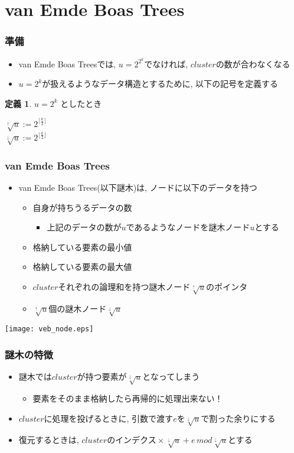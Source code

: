 \documentclass[dvipdfmx,12pt,notheorems]{beamer}
\theoremstyle{definition}
\newtheorem{definition}{定義}
\begin{document}
\section{van Emde Boas Trees}
\begin{frame}\frametitle{準備}
\begin{itemize}
\item van Emde Boas Treesでは, $u =2^{2^k}$でなければ, $cluster$の数が合わなくなる
\item $u = 2^k$が扱えるようなデータ構造とするために, 以下の記号を定義する
\end{itemize}
\begin{definition}
	$u = 2^k$ としたとき\\
	\begin{center}
	$\sqrt[\uparrow]{u} := 2^{\lceil \frac{k}{2} \rceil}$\\
	$\sqrt[\downarrow]{u} := 2^{\lfloor \frac{k}{2} \rfloor}$
	\end{center}
\end{definition}
\end{frame}

\begin{frame}\frametitle{van Emde Boas Trees}
\begin{itemize}
\item van Emde Boas Trees(以下謎木)は, ノードに以下のデータを持つ
	\begin{itemize}
	\item[\structure{$u$}] 自身が持ちうるデータの数
	\begin{itemize}\item 上記のデータの数が$u$であるようなノードを謎木ノード$u$とする\end{itemize}
	\item[\structure{$min$}] 格納している要素の最小値
	\item[\structure{$max$}] 格納している要素の最大値
	\item[\structure{$summary$}] $cluster$それぞれの論理和を持つ謎木ノード$\sqrt[\uparrow]{u}$のポインタ
	\item[\structure{$cluster$}] $\sqrt[\uparrow]{u}$個の謎木ノード$\sqrt[\downarrow]{u}$
	\end{itemize}
\end{itemize}
\texttt{[image: veb\_node.eps]}
\end{frame}

\begin{frame}\frametitle{謎木の特徴}
\begin{itemize}
\item 謎木では$cluster$が持つ要素が$\sqrt[\downarrow]{u}$となってしまう
\begin{itemize} \item 要素をそのまま格納したら再帰的に処理出来ない！ \end{itemize}
\item $cluster$に処理を投げるときに, 引数で渡す$e$を$\sqrt[\downarrow]{u}$で割った余りにする
\item 復元するときは, $cluster\mbox{のインデクス}\times \sqrt[\downarrow]{u} + e\, mod \sqrt[\downarrow]{u}$とする
\end{itemize}
\end{frame}
\end{document}
